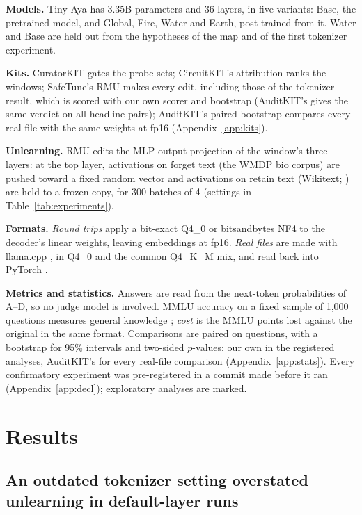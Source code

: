 \documentclass[11pt]{article}
\newcommand{\fq}{\textsc{Q4\_0}}
\newcommand{\qkm}{\textsc{Q4\_K\_M}}
\newcommand{\nf}{\textsc{NF4}}
\begin{document}
\textbf{Models.} Tiny Aya has 3.35B parameters and 36 layers, in five variants: Base, the pretrained model, and Global, Fire, Water and Earth, post-trained from it. Water and Base are held out from the hypotheses of the map and of the first tokenizer experiment.

\textbf{Kits.} CuratorKIT \citep{bhattacharjee2026curatorkit} gates the probe sets; CircuitKIT's attribution \citep{seth2026circuitkit} ranks the windows; SafeTune's RMU \citep{seth2026safetune} makes every edit, including those of the tokenizer result, which is scored with our own scorer and bootstrap (AuditKIT's gives the same verdict on all \akPairs{} headline pairs); AuditKIT's paired bootstrap \citep{arora2026auditkit} compares every real file with the same weights at fp16 (Appendix~\ref{app:kits}).

\textbf{Unlearning.} RMU edits the MLP output projection of the window's three layers: at the top layer, activations on forget text (the WMDP bio corpus) are pushed toward a fixed random vector and activations on retain text (Wikitext; \citealp{merity2016pointer}) are held to a frozen copy, for 300 batches of 4 (settings in Table~\ref{tab:experiments}).

\textbf{Formats.} \emph{Round trips} apply a bit-exact \fq{} or bitsandbytes \nf{} to the decoder's linear weights, leaving embeddings at fp16. \emph{Real files} are made with llama.cpp \citep{llamacpp}, in \fq{} and the common \qkm{} mix, and read back into PyTorch \citep{paszke2019pytorch}.

\textbf{Metrics and statistics.} Answers are read from the next-token probabilities of A--D, so no judge model is involved. MMLU accuracy on a fixed sample of 1,000 questions measures general knowledge \citep{hendrycks2021mmlu}; \emph{cost} is the MMLU points lost against the original in the same format. Comparisons are paired on questions, with a bootstrap \citep{efron1979bootstrap} for 95\% intervals and two-sided $p$-values: our own in the registered analyses, AuditKIT's for every real-file comparison (Appendix~\ref{app:stats}). Every confirmatory experiment was pre-registered in a commit made before it ran (Appendix~\ref{app:decl}); exploratory analyses are marked.

\section{Results}

\subsection{An outdated tokenizer setting overstated unlearning in default-layer runs}
\label{sec:shift}
\end{document}
